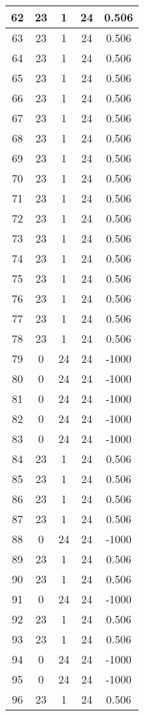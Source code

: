 \documentclass[letterpaper, 12pt]{article}
\begin{document}
\begin{longtable}{|c|c|c|c|c|}
\hline
62 & 23 & 1 & 24 & 0.506 \\
\hline
63 & 23 & 1 & 24 & 0.506 \\
\hline
64 & 23 & 1 & 24 & 0.506 \\
\hline
65 & 23 & 1 & 24 & 0.506 \\
\hline
66 & 23 & 1 & 24 & 0.506 \\
\hline
67 & 23 & 1 & 24 & 0.506 \\
\hline
68 & 23 & 1 & 24 & 0.506 \\
\hline
69 & 23 & 1 & 24 & 0.506 \\
\hline
70 & 23 & 1 & 24 & 0.506 \\
\hline
71 & 23 & 1 & 24 & 0.506 \\
\hline
72 & 23 & 1 & 24 & 0.506 \\
\hline
73 & 23 & 1 & 24 & 0.506 \\
\hline
74 & 23 & 1 & 24 & 0.506 \\
\hline
75 & 23 & 1 & 24 & 0.506 \\
\hline
76 & 23 & 1 & 24 & 0.506 \\
\hline
77 & 23 & 1 & 24 & 0.506 \\
\hline
78 & 23 & 1 & 24 & 0.506 \\
\hline
79 & 0 & 24 & 24 & -1000 \\
\hline
80 & 0 & 24 & 24 & -1000 \\
\hline
81 & 0 & 24 & 24 & -1000 \\
\hline
82 & 0 & 24 & 24 & -1000 \\
\hline
83 & 0 & 24 & 24 & -1000 \\
\hline
84 & 23 & 1 & 24 & 0.506 \\
\hline
85 & 23 & 1 & 24 & 0.506 \\
\hline
86 & 23 & 1 & 24 & 0.506 \\
\hline
87 & 23 & 1 & 24 & 0.506 \\
\hline
88 & 0 & 24 & 24 & -1000 \\
\hline
89 & 23 & 1 & 24 & 0.506 \\
\hline
90 & 23 & 1 & 24 & 0.506 \\
\hline
91 & 0 & 24 & 24 & -1000 \\
\hline
92 & 23 & 1 & 24 & 0.506 \\
\hline
93 & 23 & 1 & 24 & 0.506 \\
\hline
94 & 0 & 24 & 24 & -1000 \\
\hline
95 & 0 & 24 & 24 & -1000 \\
\hline
96 & 23 & 1 & 24 & 0.506 \\

\end{longtable}
\end{document}
